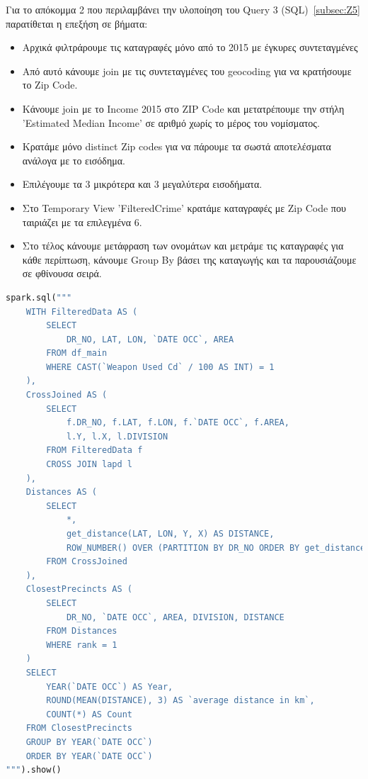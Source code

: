 \documentclass{article}
\begin{document}
Για το απόκομμα 2 που περιλαμβάνει την υλοποίηση του Query 3 (SQL)~\ref{subsec:Z5} παρατίθεται η επεξήση σε βήματα: 
\begin{itemize}
    \item   Αρχικά φιλτράρουμε τις καταγραφές μόνο από το 2015 με έγκυρες συντεταγμένες
    \item   Από αυτό κάνουμε  join  με τις συντεταγμένες του geocoding  για να κρατήσουμε το  Zip Code. 
    \item   {} Κάνουμε  join  με το  Income 2015  στο  ZIP Code  και μετατρέπουμε την στήλη  'Estimated Median Income'  σε αριθμό χωρίς το μέρος του νομίσματος.
    \item   Κρατάμε μόνο  distinct Zip codes  για να πάρουμε τα σωστά αποτελέσματα ανάλογα με το εισόδημα.
    \item   Επιλέγουμε τα 3 μικρότερα και 3 μεγαλύτερα εισοδήματα.
    \item   Στο  Temporary View 'FilteredCrime'  κρατάμε καταγραφές με  Zip Code  που ταιριάζει με τα επιλεγμένα 6. 
    \item   Στο τέλος κάνουμε μετάφραση των ονομάτων και μετράμε τις καταγραφές για κάθε περίπτωση, κάνουμε  Group By βάσει της καταγωγής και τα παρουσιάζουμε σε φθίνουσα σειρά. 
\end{itemize}

\begin{lstlisting}[language=Python, caption={Query 4 2a - SQL}]
spark.sql("""
    WITH FilteredData AS (
        SELECT
            DR_NO, LAT, LON, `DATE OCC`, AREA
        FROM df_main
        WHERE CAST(`Weapon Used Cd` / 100 AS INT) = 1
    ),
    CrossJoined AS (
        SELECT
            f.DR_NO, f.LAT, f.LON, f.`DATE OCC`, f.AREA,
            l.Y, l.X, l.DIVISION
        FROM FilteredData f
        CROSS JOIN lapd l
    ),
    Distances AS (
        SELECT
            *,
            get_distance(LAT, LON, Y, X) AS DISTANCE,
            ROW_NUMBER() OVER (PARTITION BY DR_NO ORDER BY get_distance(LAT, LON, Y, X)) AS rank
        FROM CrossJoined
    ),
    ClosestPrecincts AS (
        SELECT
            DR_NO, `DATE OCC`, AREA, DIVISION, DISTANCE
        FROM Distances
        WHERE rank = 1
    )
    SELECT
        YEAR(`DATE OCC`) AS Year,
        ROUND(MEAN(DISTANCE), 3) AS `average distance in km`,
        COUNT(*) AS Count
    FROM ClosestPrecincts
    GROUP BY YEAR(`DATE OCC`)
    ORDER BY YEAR(`DATE OCC`)
""").show()
    
\end{lstlisting}
\end{document}
